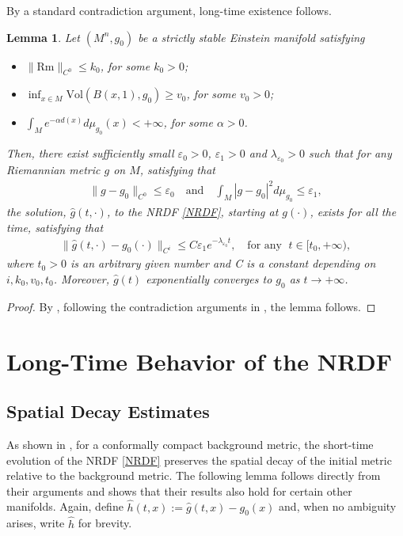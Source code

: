 \documentclass[12pt]{amsart}
\newtheorem{lemma}{Lemma}[section]
\begin{document}
By a standard contradiction argument, long-time existence follows.
\begin{lemma}\label{long time existence without weights}
    Let $(M^n, g_0)$ be a strictly stable Einstein manifold satisfying
    \begin{itemize}
        \item $\|\mathrm{Rm}\|_{C^0} \leq k_0$, for some $k_0 > 0$;
        \item $\displaystyle \inf_{x\in M} \mathrm{Vol}(B(x, 1), g_0) \geq v_0$, for some $v_0 > 0$;
        \item $\displaystyle \int_{M} e^{-\alpha d(x)} d\mu_{g_0}(x) < +\infty$, for some $\alpha > 0$.
    \end{itemize}
    Then, there exist sufficiently small $\varepsilon_0 >0$, $\varepsilon_1 > 0$ and $\lambda_{\varepsilon_0} > 0$ such that for any Riemannian metric $g$ on $M$, satisfying that 
    \begin{align*}
        \|g - g_0\|_{C^{0}} \leq \varepsilon_0 \quad \text{and} \quad \int_{M}|g - g_0|^2 d\mu_{g_0} \leq \varepsilon_1, 
    \end{align*}
    the solution, $\hat{g}(t, \cdot)$, to the NRDF \eqref{NRDF}, starting at $g(\cdot)$, exists for all the time, satisfying that 
    \begin{align}\label{long time existence with weight result 1}
        \|\hat{g}(t, \cdot) - g_0(\cdot)\|_{C^{i}} \leq C \varepsilon_1 e^{-\lambda_{\varepsilon_0} t}, \quad \text{for any }\; t\in [t_0, +\infty), 
    \end{align}
    where $t_0 > 0$ is an arbitrary given number and C is a constant depending on $i, k_0, v_0, t_0$. Moreover, $\hat{g}(t)$ exponentially converges to $g_0$ as $t\rightarrow +\infty$. 
\end{lemma}
\begin{proof}
    By , following the contradiction arguments in \cite{QSW2013, Ye1993}, the lemma follows.
\end{proof}

\section{Long-Time Behavior of the NRDF}\label{sec: longtime}

\subsection{Spatial Decay Estimates}
As shown in \cite{HJS2016, QSW2013}, for a conformally compact background metric, the short-time evolution of the NRDF \eqref{NRDF} preserves the spatial decay of the initial metric relative to the background metric. The following lemma follows directly from their arguments and shows that their results also hold for certain other manifolds. Again, define $\hat{h}(t,x) := \hat{g}(t,x) - g_0(x)$ and, when no ambiguity arises, write $\hat{h}$ for brevity.
\end{document}

